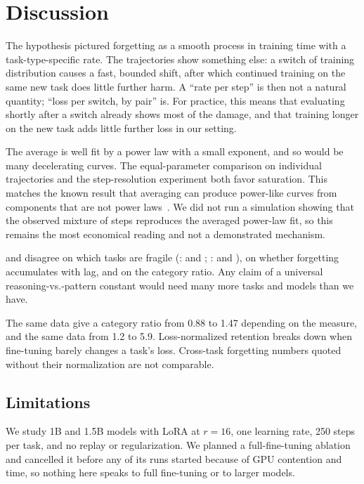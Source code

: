 \section{Discussion}
\label{sec:discussion}

The hypothesis pictured forgetting as a smooth process in training time with a task-type-specific rate.
The trajectories show something else: a switch of training distribution causes a fast, bounded shift, after which continued training on the same new task does little further harm.
A ``rate per step'' is then not a natural quantity; ``loss per switch, by pair'' is.
For practice, this means that evaluating shortly after a switch already shows most of the damage, and that training longer on the new task adds little further loss in our setting.

The \llama average is well fit by a power law with a small exponent, and so would be many decelerating curves.
The equal-parameter comparison on individual trajectories and the step-resolution experiment both favor saturation.
This matches the known result that averaging can produce power-like curves from components that are not power laws~\cite{anderson1997artifactual}.
We did not run a simulation showing that the observed mixture of steps reproduces the averaged power-law fit, so this remains the most economical reading and not a demonstrated mechanism.

\llama and \qwen disagree on which tasks are fragile (\llama: \tlogic and \tmt; \qwen: \tarith and \tgsm), on whether forgetting accumulates with lag, and on the category ratio.
Any claim of a universal reasoning-vs.-pattern constant would need many more tasks and models than we have.

The same \llama data give a category ratio from 0.88 to 1.47 depending on the measure, and the same \qwen data from 1.2 to 5.9.
Loss-normalized retention breaks down when fine-tuning barely changes a task's loss.
Cross-task forgetting numbers quoted without their normalization are not comparable.

\subsection{Limitations}
\label{sec:limitations}

We study 1B and 1.5B models with LoRA at $r{=}16$, one learning rate, 250 steps per task, and no replay or regularization.
We planned a full-fine-tuning ablation and cancelled it before any of its runs started because of GPU contention and time, so nothing here speaks to full fine-tuning or to larger models.

